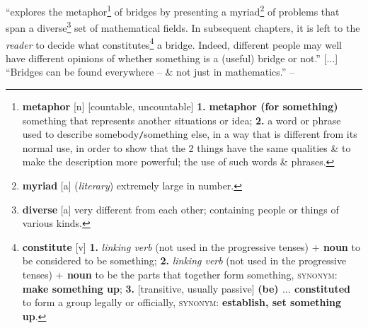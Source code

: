 \documentclass[oneside]{book}
\numberwithin{equation}{section}
\begin{document}
\cite[Chap. 1]{Andreescu_Mortici_Tetiva2017} ``explores the metaphor\footnote{\textbf{metaphor} [n] [countable, uncountable] \textbf{1.} \textbf{metaphor (for something)} something that represents another situations or idea; \textbf{2.} a word or phrase used to describe somebody\texttt{/}something else, in a way that is different from its normal use, in order to show that the 2 things have the same qualities \& to make the description more powerful; the use of such words \& phrases.} of bridges by presenting a myriad\footnote{\textbf{myriad} [a] (\textit{literary}) extremely large in number.} of problems that span a diverse\footnote{\textbf{diverse} [a] very different from each other; containing people or things of various kinds.} set of mathematical fields. In subsequent chapters, it is left to the \textit{reader} to decide what constitutes\footnote{\textbf{constitute} [v] \textbf{1.} \textit{linking verb} (not used in the progressive tenses) \textbf{$+$ noun} to be considered to be something; \textbf{2.} \textit{linking verb} (not used in the progressive tenses) \textbf{$+$ noun} to be the parts that together form something, \textsc{synonym}: \textbf{make something up}; \textbf{3.} [transitive, usually passive] \textbf{(be) $\ldots$ constituted} to form a group legally or officially, \textsc{synonym}: \textbf{establish, set something up}.} a bridge. Indeed, different people may well have different opinions of whether something is a (useful) bridge or not.'' [$\ldots$] ``Bridges can be found everywhere -- \& not just in mathematics.'' -- \cite[Preface, p. v]{Andreescu_Mortici_Tetiva2017}
\end{document}

